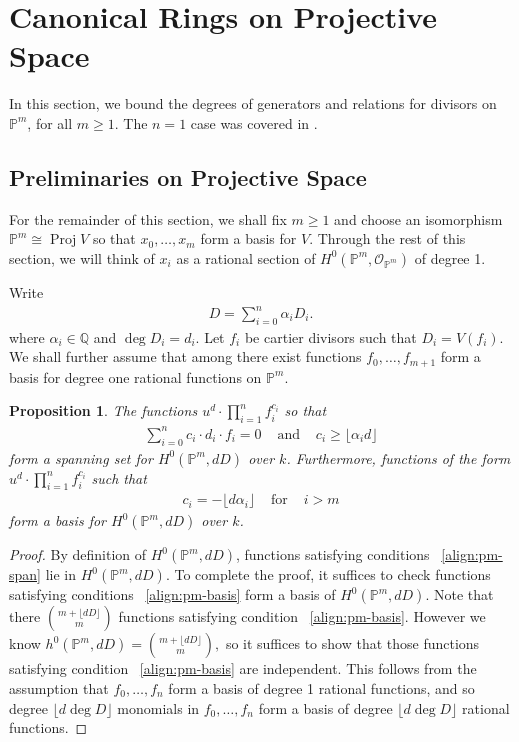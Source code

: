 \documentclass{amsart}
\theoremstyle{plain}
\newtheorem{prop}[thm]{Proposition}
\theoremstyle{definition}
\theoremstyle{remark}
\numberwithin{equation}{section}
\newcommand\ssec{\subsection}
\newcommand\bq{{\mathbb Q}}
\newcommand\bp{{\mathbb P}}
\newcommand\sco{{\mathscr O}}
\DeclareMathOperator{\proj}{Proj}
\begin{document}
\section{Canonical Rings on Projective Space}
In this section, we bound the degrees of generators and relations for divisors on $\bp^m$, for all $m \geq 1$. The $n = 1$ case was covered in \cite{dorney:canonical}.

\ssec{Preliminaries on Projective Space}

For the remainder of this section, we shall fix $m \geq 1$ and choose an isomorphism $\bp^m \cong \proj V$ so that $x_0,\ldots, x_m$ form a basis for $V$. Through the rest of this section, we will think of $x_i$ as a rational section of $H^0(\bp^m, \sco_{\bp^m})$ of degree 1.


Write
\begin{align*}
	D = \sum_{i=0}^{n}\alpha_i D_i.
\end{align*}
where $\alpha_i \in \bq$ and $\deg D_i = d_i$. Let $f_i$ be cartier divisors such that $D_i = V(f_i)$. We shall further assume that among there exist functions $f_0,\ldots, f_{m+1}$ form a basis for degree one rational functions on $\bp^m$.

\begin{prop}
\label{prop:pm-span-and-basis}
The functions $u^d \cdot \prod_{i=1}^n f_i^{c_i}$ so that 
\begin{align}
\label{align:pm-span}
\sum_{i=0}^{n} c_i \cdot d_i \cdot f_i = 0 & \text{ and } &c_i \geq \lfloor \alpha_i d\rfloor	
\end{align}
form a spanning set for $H^0(\bp^m, dD)$ over $k$. Furthermore, functions 
of the form $u^d \cdot \prod_{i=1}^n f_i^{c_i} $ such that
\begin{align}
\label{align:pm-basis}
c_i = -\lfloor d\alpha_i \rfloor & \text{ for } & i > m
\end{align}
form a basis for $H^0(\bp^m, dD)$ over $k$.
\end{prop}
\begin{proof}
By definition of $H^0(\bp^m,dD)$, functions satisfying conditions 
~\eqref{align:pm-span} lie in $H^0(\bp^m,dD)$. To complete the proof, it suffices to check functions satisfying conditions ~\eqref{align:pm-basis} form a basis of $H^0(\bp^m,dD)$. Note that there $\binom{m+ \lfloor dD \rfloor }{m}$ functions satisfying condition ~\eqref{align:pm-basis}. However we know $h^0(\bp^m,dD) = \binom{m+ \lfloor dD \rfloor }{m},$ so it suffices to show that those functions satisfying condition ~\eqref{align:pm-basis} are independent. This follows from the assumption that $f_0,\ldots, f_n$ form a basis of degree 1 rational functions, and so degree $\lfloor d \deg D \rfloor $ monomials in $f_0,\ldots, f_n$ form a basis of degree $\lfloor d \deg D \rfloor $ rational functions.
\end{proof}
\end{document}
